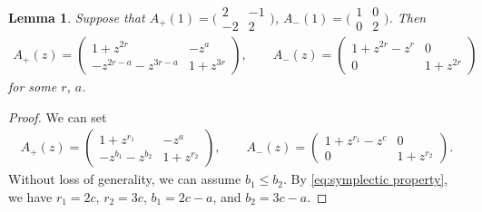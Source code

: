 \documentclass[10pt,a4paper]{amsart}
\numberwithin{equation}{section}
\newtheorem{Lemma}[Theorem]{Lemma}
\theoremstyle{definition}
\begin{document}
\begin{Lemma}\label{lemma:Apm(z) 5}
 Suppose that
$
 A_{+}(1) =
 \bigl( \begin{smallmatrix}
 2 & - 1 \\
 -2 & 2
 \end{smallmatrix}\bigr)$, $
 A_{-}(1) =
 \bigl( \begin{smallmatrix}
 1 & 0 \\
 0 & 2
 \end{smallmatrix}\bigr)$.
 Then
 \begin{align*}
 A_{+}(z) =
 \begin{pmatrix}
 1+z^{2r} & - z^a \\
 -z^{2r-a}-z^{3r-a} & 1+z^{3r}
 \end{pmatrix},\qquad
 A_{-}(z) =
 \begin{pmatrix}
 1+z^{2r}-z^r & 0 \\
 0 & 1+z^{2r}
 \end{pmatrix}
 \end{align*}
 for some $r$, $a$.
\end{Lemma}
\begin{proof}
 We can set
 \begin{align*}
 A_{+}(z) =
 \begin{pmatrix}
 1+z^{r_1} & - z^a \\
 -z^{b_1}-z^{b_2} & 1+z^{r_2}
 \end{pmatrix},\qquad
 A_{-}(z) =
 \begin{pmatrix}
 1+z^{r_1}-z^c & 0 \\
 0 & 1+z^{r_2}
 \end{pmatrix}.
 \end{align*}
 Without loss of generality, we can assume $b_1 \leq b_2$.
 By \eqref{eq:symplectic property},
 we have $r_1=2c$, $r_2=3c$, $b_1 = 2c-a$, and $b_2=3c-a$.
\end{proof}
\end{document}
